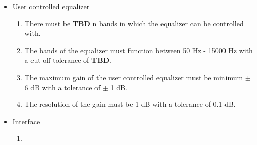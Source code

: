 \begin{itemize}
\item User controlled equalizer
\begin{enumerate}
\item There must be \textbf{TBD} n bands in which the equalizer can be controlled with. 
\item The bands of the equalizer must function between 50 Hz - 15000 Hz with a cut off tolerance of \textbf{TBD}. 
\item The maximum gain of the user controlled equalizer must be minimum $\pm$ 6 dB with a tolerance of $\pm$ 1 dB.
\item The resolution of the gain must be 1 dB with a tolerance of 0.1 dB.
\end{enumerate}
\end{itemize}

\begin{itemize}
\item Interface
\begin{enumerate}
\item 
\end{enumerate}
\end{itemize}
